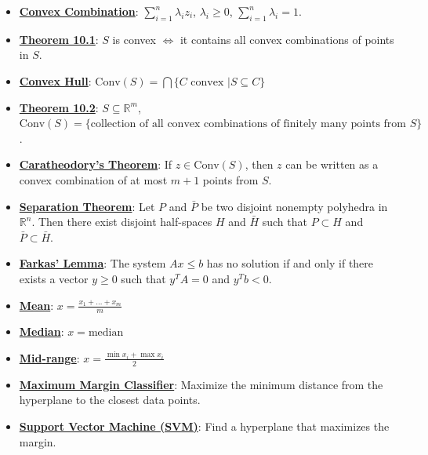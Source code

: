 \documentclass{article}%
\begin{document}
\begin{itemize}[leftmargin=*]
\item \href{https://www.math.purdue.edu/~yipn/421/2024-10-22-Convexity.pdf#page=1}{\textbf{Convex Combination}}: $\sum_{i=1}^n \lambda_i z_i$, $\lambda_i \ge 0$, $\sum_{i=1}^n \lambda_i = 1$.%
\item \href{https://www.math.purdue.edu/~yipn/421/2024-10-22-Convexity.pdf#page=2}{\textbf{Theorem 10.1}}: $S$ is convex $\iff$ it contains all convex combinations of points in $S$.%
\item \href{https://www.math.purdue.edu/~yipn/421/2024-10-22-Convexity.pdf#page=5}{\textbf{Convex Hull}}: $\text{Conv}(S) = \bigcap \{C \text{ convex } | S \subseteq C\}$%
\item \href{https://www.math.purdue.edu/~yipn/421/2024-10-22-Convexity.pdf#page=5}{\textbf{Theorem 10.2}}: $S \subseteq \mathbb{R}^m$, $\text{Conv}(S) = \{\text{collection of all convex combinations of finitely many points from } S\}$.%
\item \href{https://www.math.purdue.edu/~yipn/421/2024-10-22-Convexity.pdf#page=8}{\textbf{Caratheodory's Theorem}}: If $z \in \text{Conv}(S)$, then $z$ can be written as a convex combination of at most $m+1$ points from $S$.%
\item \href{https://www.math.purdue.edu/~yipn/421/2024-10-22-Convexity.pdf#page=10}{\textbf{Separation Theorem}}: Let $P$ and $\bar{P}$ be two disjoint nonempty polyhedra in $\mathbb{R}^n$. Then there exist disjoint half-spaces $H$ and $\bar{H}$ such that $P \subset H$ and $\bar{P} \subset \bar{H}$.%
\item \href{https://www.math.purdue.edu/~yipn/421/2024-10-22-Convexity.pdf#page=12}{\textbf{Farkas' Lemma}}: The system $Ax \le b$ has no solution if and only if there exists a vector $y \ge 0$ such that $y^T A = 0$ and $y^T b < 0$.%
\item \href{https://www.math.purdue.edu/~yipn/421/2024-10-22-Regression.pdf#page=1}{\textbf{Mean}}: $x = \frac{x_1 + ... + x_m}{m}$%
\item \href{https://www.math.purdue.edu/~yipn/421/2024-10-22-Regression.pdf#page=1}{\textbf{Median}}: $x = \text{median}$%
\item \href{https://www.math.purdue.edu/~yipn/421/2024-10-22-Regression.pdf#page=1}{\textbf{Mid{-}range}}: $x = \frac{\min x_i + \max x_i}{2}$%
\item \href{https://www.math.purdue.edu/~yipn/421/2024-10-22-Regression.pdf#page=9}{\textbf{Maximum Margin Classifier}}: Maximize the minimum distance from the hyperplane to the closest data points.%
\item \href{https://www.math.purdue.edu/~yipn/421/2024-10-22-Regression.pdf#page=10}{\textbf{Support Vector Machine (SVM)}}: Find a hyperplane that maximizes the margin. %

\end{itemize}
\end{document}
